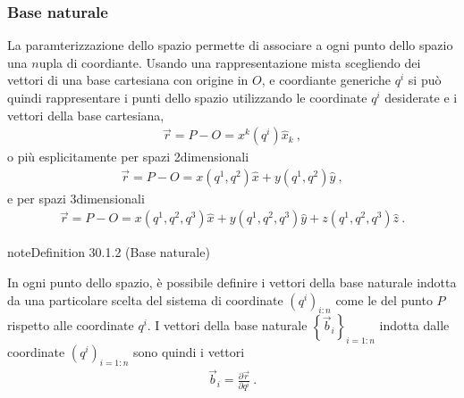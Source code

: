 \documentclass[letterpaper,10pt,italian]{jupyterBook}
\begin{document}
\subsubsection{Base naturale}
\label{\detokenize{ch/vector-calculus/geometry:base-naturale}}\label{\detokenize{ch/vector-calculus/geometry:vector-calculus-geometry-natural-basis}}
\sphinxAtStartPar
La paramterizzazione dello spazio permette di associare a ogni punto dello spazio una \(n\)\sphinxhyphen{}upla di coordiante. Usando una rappresentazione mista \sphinxhyphen{} scegliendo dei vettori di una base cartesiana con origine in \(O\), e coordiante generiche \(q^i\) \sphinxhyphen{} si può quindi rappresentare i punti dello spazio utilizzando le coordinate \(q^i\) desiderate e i vettori della base cartesiana,
\begin{equation*}
\begin{split}\vec{r} = P - O = x^k \left(q^i\right) \hat{x}_k \ ,\end{split}
\end{equation*}
\sphinxAtStartPar
o più esplicitamente per spazi 2\sphinxhyphen{}dimensionali
\begin{equation*}
\begin{split}\vec{r} = P - O = x \left(q^1, q^2\right) \hat{x} + y\left(q^1, q^2\right) \hat{y} \ ,\end{split}
\end{equation*}
\sphinxAtStartPar
e per spazi 3\sphinxhyphen{}dimensionali
\begin{equation*}
\begin{split}\vec{r} = P - O = x \left(q^1, q^2, q^3\right) \hat{x} + y\left(q^1, q^2, q^3 \right) \hat{y} + z\left( q^1, q^2, q^3 \right) \hat{z} \ .\end{split}
\end{equation*}\label{ch/vector-calculus/geometry:def-natural-base}
\begin{sphinxadmonition}{note}{Definition 30.1.2 (Base naturale)}



\sphinxAtStartPar
In ogni punto dello spazio, è possibile definire i vettori della base naturale indotta da una particolare scelta del sistema di coordinate \(\left( q^i \right)_{i:n}\) come le {\hyperref[\detokenize{ch/multivariable-calculus/derivatives:multivariable-calculus-derivatives-partial}]{}} del punto \(P\) rispetto alle coordinate \(q^i\). I vettori della base naturale \(\left\{\vec{b}_i \right\}_{i=1:n}\) indotta dalle coordinate \(\left( q^i \right)_{i=1:n}\) sono quindi i vettori
\begin{equation*}
\begin{split}\vec{b}_i = \frac{\partial \vec{r}}{\partial q^i} \ .\end{split}
\end{equation*}\end{sphinxadmonition}
\end{document}
